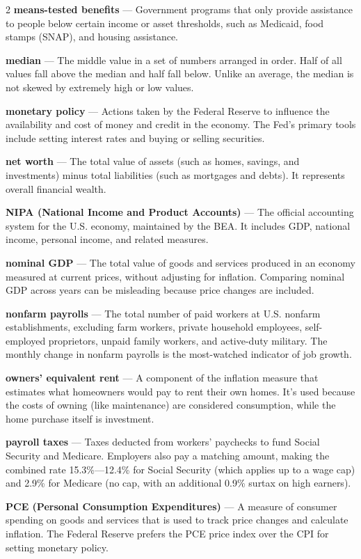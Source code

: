 \begin{multicols}{2}
\textbf{means-tested benefits} --- Government programs that only provide assistance to people below certain income or asset thresholds, such as Medicaid, food stamps (SNAP), and housing assistance.

\textbf{median} --- The middle value in a set of numbers arranged in order. Half of all values fall above the median and half fall below. Unlike an average, the median is not skewed by extremely high or low values.

\textbf{monetary policy} --- Actions taken by the Federal Reserve to influence the availability and cost of money and credit in the economy. The Fed's primary tools include setting interest rates and buying or selling securities.

\textbf{net worth} --- The total value of assets (such as homes, savings, and investments) minus total liabilities (such as mortgages and debts). It represents overall financial wealth.

\textbf{NIPA (National Income and Product Accounts)} --- The official accounting system for the U.S. economy, maintained by the BEA. It includes GDP, national income, personal income, and related measures.

\textbf{nominal GDP} --- The total value of goods and services produced in an economy measured at current prices, without adjusting for inflation. Comparing nominal GDP across years can be misleading because price changes are included.

\textbf{nonfarm payrolls} --- The total number of paid workers at U.S. nonfarm establishments, excluding farm workers, private household employees, self-employed proprietors, unpaid family workers, and active-duty military. The monthly change in nonfarm payrolls is the most-watched indicator of job growth.

\textbf{owners' equivalent rent} --- A component of the inflation measure that estimates what homeowners would pay to rent their own homes. It's used because the costs of owning (like maintenance) are considered consumption, while the home purchase itself is investment.

\textbf{payroll taxes} --- Taxes deducted from workers' paychecks to fund Social Security and Medicare. Employers also pay a matching amount, making the combined rate 15.3\%---12.4\% for Social Security (which applies up to a wage cap) and 2.9\% for Medicare (no cap, with an additional 0.9\% surtax on high earners).

\textbf{PCE (Personal Consumption Expenditures)} --- A measure of consumer spending on goods and services that is used to track price changes and calculate inflation. The Federal Reserve prefers the PCE price index over the CPI for setting monetary policy.


\end{multicols}
